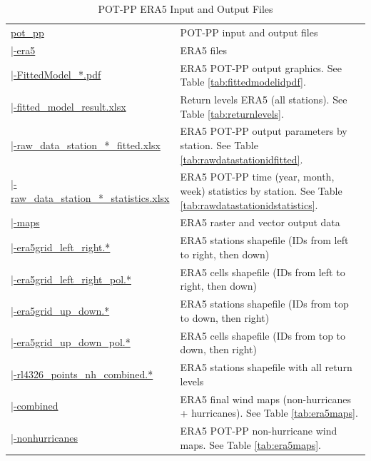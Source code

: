 \documentclass[12pt,oneside]{reedthesis}
\begin{document}
\begin{longtable}[t]{>{\raggedright\arraybackslash}p{2.2in}>{\raggedright\arraybackslash}p{4in}}
\caption[POT-PP ERA5 Input and Output Files]{\label{tab:resultsstructureera5}POT-PP ERA5 Input and Output Files}\\
\toprule
\multicolumn{1}{l}{Folder Tree - Ftp Links} & \multicolumn{1}{l}{Description}\\
\midrule
\href{ftp://ftp.geocorp.co/windthesis/potpp/}{pot\_pp} & POT-PP input and output files\\
\href{ftp://ftp.geocorp.co/windthesis/potpp/era5/}{\;\;|-era5} & ERA5 files\\
\href{ftp://ftp.geocorp.co/windthesis/potpp/era5/}{\;\;\;\;|-FittedModel\_*.pdf} & ERA5 POT-PP output graphics. See Table \ref{tab:fittedmodelidpdf}.\\
\href{ftp://ftp.geocorp.co/windthesis/potpp/era5/fitted_model_result_PoissonProcessGumbelIntFunc.xlsx}{\;\;\;\;|-fitted\_model\_result.xlsx} & Return levels ERA5 (all stations). See Table \ref{tab:returnlevels}.\\
\href{ftp://ftp.geocorp.co/windthesis/potpp/era5/}{\;\;\;\;|-raw\_data\_station\_*\_fitted.xlsx} & ERA5 POT-PP output parameters by station. See Table \ref{tab:rawdatastationidfitted}.\\
\href{ftp://ftp.geocorp.co/windthesis/potpp/era5/}{\;\;\;\;|-raw\_data\_station\_*\_statistics.xlsx} & ERA5 POT-PP time (year, month, week) statistics by station. See Table \ref{tab:rawdatastationidstatistics}.\\
\href{ftp://ftp.geocorp.co/windthesis/potpp/era5/maps/}{\;\;\;\;|-maps} & ERA5 raster and vector output data\\
\href{ftp://ftp.geocorp.co/windthesis/potpp/era5/maps/}{\;\;\;\;\;\;|-era5grid\_left\_right.*} & ERA5 stations shapefile (IDs from left to right, then down)\\
\href{ftp://ftp.geocorp.co/windthesis/potpp/era5/maps/}{\;\;\;\;\;\;|-era5grid\_left\_right\_pol.*} & ERA5 cells shapefile (IDs from left to right, then down)\\
\href{ftp://ftp.geocorp.co/windthesis/potpp/era5/maps/}{\;\;\;\;\;\;|-era5grid\_up\_down.*} & ERA5 stations shapefile (IDs from top to down, then right)\\
\href{ftp://ftp.geocorp.co/windthesis/potpp/era5/maps/}{\;\;\;\;\;\;|-era5grid\_up\_down\_pol.*} & ERA5 cells shapefile (IDs from top to down, then right)\\
\href{ftp://ftp.geocorp.co/windthesis/potpp/era5/maps/}{\;\;\;\;\;\;|-rl4326\_points\_nh\_combined.*} & ERA5 stations shapefile with all return levels\\
\href{ftp://ftp.geocorp.co/windthesis/potpp/era5/maps/combined/}{\;\;\;\;\;\;|-combined} & ERA5 final wind maps (non-hurricanes + hurricanes). See Table \ref{tab:era5maps}.\\
\href{ftp://ftp.geocorp.co/windthesis/potpp/era5/maps/nonhurricanes/}{\;\;\;\;\;\;|-nonhurricanes} & ERA5 POT-PP non-hurricane wind maps. See Table \ref{tab:era5maps}.\\
\bottomrule
\end{longtable}
\endgroup{}
\end{document}
